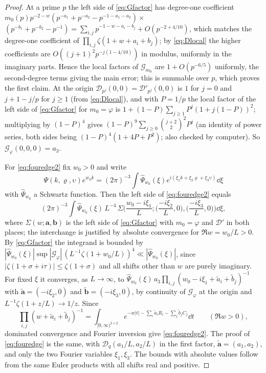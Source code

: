 \documentclass[11pt,colorlinks]{charlie}
\begin{document}
\begin{proof}
At a prime $p$ the left side of \eqref{eq:Gfactor} has degree-one coefficient $m_0(p)p^{-2-w}(p^{-a_1}+p^{-a_2}-p^{-1-a_1-a_2})\times{}$ $(p^{-b_1}+p^{-b_2}-p^{-1})=\sum_{i,j}p^{-1-w-a_i-b_j}+O(p^{-2+4/10})$, which matches the degree-one coefficient of $\prod_{i,j}\zeta(1+w+a_i+b_j)$; by \eqref{eq:Dlocal} the higher coefficients are $O((j+1)^2p^{-j(1-4/10)})$ in modulus, uniformly in the imaginary parts. Hence the local factors of $\mathcal G_{m_0}$ are $1+O(p^{-6/5})$ uniformly, the second-degree terms giving the main error; this is summable over $p$, which proves the first claim. At the origin $\mathcal D_{p^j}(0,0)=\mathcal D'_{p^j}(0,0)$ is $1$ for $j=0$ and $j+1-j/p$ for $j\ge1$ (from \eqref{eq:Dlocal}), and with $P=1/p$ the local factor of the left side of \eqref{eq:Gfactor} for $m_0=\varphi$ is $1+(1-P)\sum_{j\ge1}P^j(1+j(1-P))^2$; multiplying by $(1-P)^4$ gives $(1-P)^9\sum_{j\ge0}\binom{j+2}2^2P^j$ (an identity of power series, both sides being $(1-P)^4(1+4P+P^2)$; also checked by computer). So $\mathcal G_\varphi(0,0,0)=a_3$.

For \eqref{eq:fouredge2} fix $w_0>0$ and write
\[
 \Psi(k,\varrho,\upsilon)e^{w_0k}=(2\pi)^{-3}\int\widehat\Psi_{w_0}(\xi)e^{i(\xi_1k+\xi_2\varrho+\xi_3\upsilon)}\dd\xi
\]
with $\widehat\Psi_{w_0}$ a Schwartz function. Then the left side of \eqref{eq:fouredge2} equals
\[
 (2\pi)^{-3}\int\widehat\Psi_{w_0}(\xi)\,L^{-4}\,\Sigma\Big(\frac{w_0-i\xi_1}L;\Big(\frac{-i\xi_2}L,0\Big),\Big(\frac{-i\xi_3}L,0\Big)\Big)\dd\xi,
\]
where $\Sigma(w;\boldsymbol a,\boldsymbol b)$ is the left side of \eqref{eq:Gfactor} with $m_0=\varphi$ and $\mathcal D'$ in both places; the interchange is justified by absolute convergence for $\Re w=w_0/L>0$. By \eqref{eq:Gfactor} the integrand is bounded by $|\widehat\Psi_{w_0}(\xi)|\sup|\mathcal G_\varphi|\,(L^{-1}\zeta(1+w_0/L))^4\ll|\widehat\Psi_{w_0}(\xi)|$, since $|\zeta(1+\sigma+i\tau)|\le\zeta(1+\sigma)$ and all shifts other than $w$ are purely imaginary. For fixed $\xi$ it converges, as $L\to\infty$, to $\widehat\Psi_{w_0}(\xi)\,a_3\prod_{i,j}(w_0-i\xi_1+\tilde a_i+\tilde b_j)^{-1}$ with $\tilde{\boldsymbol a}=(-i\xi_2,0)$ and $\tilde{\boldsymbol b}=(-i\xi_3,0)$, by continuity of $\mathcal G_\varphi$ at the origin and $L^{-1}\zeta(1+z/L)\to1/z$. Since
\[
 \prod_{i,j}(w+\tilde a_i+\tilde b_j)^{-1}=\int_{[0,\infty)^{2\times2}}e^{-w|t|-\sum_i\tilde a_iR_i-\sum_j\tilde b_jC_j}\dd t\qquad(\Re w>0),
\]
dominated convergence and Fourier inversion give \eqref{eq:fouredge2}. The proof of \eqref{eq:fouredge} is the same, with $\mathcal D_q(a_1/L,a_2/L)$ in the first factor, $\tilde{\boldsymbol a}=(a_1,a_2)$, and only the two Fourier variables $\xi_1,\xi_3$. The bounds with absolute values follow from the same Euler products with all shifts real and positive.
\end{proof}
\end{document}
